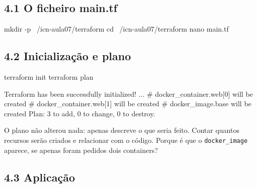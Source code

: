 \documentclass[11pt,a4paper]{article}
\newcommand{\cmd}[1]{\texttt{#1}}
\begin{document}
\subsection*{4.1 O ficheiro main.tf}

\begin{terminal}
mkdir -p ~/icn-aula07/terraform
cd ~/icn-aula07/terraform
nano main.tf
\end{terminal}


\subsection*{4.2 Inicialização e plano}

\begin{terminal}
terraform init
terraform plan
\end{terminal}

\begin{saida}
Terraform has been successfully initialized!
...
  # docker_container.web[0] will be created
  # docker_container.web[1] will be created
  # docker_image.base will be created
Plan: 3 to add, 0 to change, 0 to destroy.
\end{saida}

\begin{observe}
O plano não alterou nada: apenas descreve o que seria feito. Contar quantos recursos serão criados e relacionar com o código. Porque é que o \cmd{docker\_image} aparece, se apenas foram pedidos dois containers?
\end{observe}

\subsection*{4.3 Aplicação}
\end{document}
